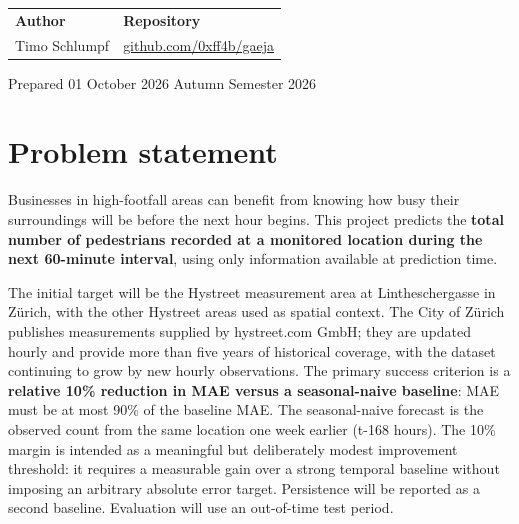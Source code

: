 \documentclass[10pt,a4paper]{article}
\begin{document}
\vspace{10mm}


\vfill

{\scriptsize
\begin{tabularx}{\textwidth}{@{}X X@{}}
\textbf{Author} & \textbf{Repository}\\
Timo Schlumpf & \href{https://github.com/0xff4b/gaeja}{github.com/0xff4b/gaeja}\\
\end{tabularx}
}

\vspace{3mm}
{\scriptsize\color{Muted}Prepared 01 October 2026 \textbullet{} Autumn Semester 2026}

\newpage

\fontsize{8.9}{10.15}\selectfont
\setlength{\parskip}{2.2pt}
\titlespacing*{\section}{0pt}{3.5pt}{2pt}

\section{Problem statement}
Businesses in high-footfall areas can benefit from knowing how busy their surroundings will be before the next hour begins. This project predicts the \textbf{total number of pedestrians recorded at a monitored location during the next 60-minute interval}, using only information available at prediction time.

The initial target will be the Hystreet measurement area at Lintheschergasse in Z\"urich, with the other Hystreet areas used as spatial context. The City of Z\"urich publishes measurements supplied by hystreet.com GmbH; they are updated hourly and provide more than five years of historical coverage, with the dataset continuing to grow by new hourly observations. The primary success criterion is a \textbf{relative 10\% reduction in MAE versus a seasonal-naive baseline}: MAE must be at most 90\% of the baseline MAE. The seasonal-naive forecast is the observed count from the same location one week earlier (t-168 hours). The 10\% margin is intended as a meaningful but deliberately modest improvement threshold: it requires a measurable gain over a strong temporal baseline without imposing an arbitrary absolute error target. Persistence will be reported as a second baseline. Evaluation will use an out-of-time test period.
\end{document}
